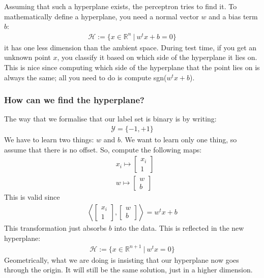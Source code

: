 \documentclass[11pt]{scrartcl}
\newcommand{\R}[0]{\mathbb{R}}
\theoremstyle{definition}
\theoremstyle{remark}
\begin{document}
Assuming that such a hyperplane exists, the perceptron tries to find it. To mathematically define a hyperplane, you need a normal vector $w$ and a bias term $b$: 
\begin{align}
	\mathcal{H}:= \{ x \in \R^n\ |\ w^t x + b = 0 \} 	
\end{align}
it has one less dimension than the ambient space. During test time, if you get an unknown point $x$, you classify it based on which side of the hyperplane it lies on. This is nice since  computing which side of the hyperplane that the point lies on is always the same; all you need to do is compute sgn($w^t x + b$). 

\subsubsection{How can we find the hyperplane?}

The way that we formalise that our label set is binary is by writing: 
\begin{align*}
	\mathcal{Y} = \{ -1, +1 \} 	
\end{align*}
We have to learn two things: $w$ and $b$. We want to learn only one thing, so assume that there is no offset. So, compute the following maps: 
\begin{align*}
	& x_i \mapsto \begin{bmatrix}
		x_i \\
		1 
	\end{bmatrix}	\\
	& w \mapsto \begin{bmatrix}
		w \\
		b
	\end{bmatrix} 
\end{align*}
This is valid since 
\begin{align*}
 	\left\langle 	\begin{bmatrix}
		x_i \\
		1 
	\end{bmatrix} , \begin{bmatrix}
		w \\
		b
	\end{bmatrix} \right\rangle = w^tx + b 
\end{align*}
This transformation just absorbs $b$ into the data. This is reflected in the new hyperplane: 
\begin{align*}
	\mathcal{H} := \{ x \in \R^{n+1}\ |\ w^tx = 0 \}
\end{align*}
Geometrically, what we are doing is insisting that our hyperplane now goes through the origin. It will still be the same solution, just in a higher dimension. 
\end{document}
